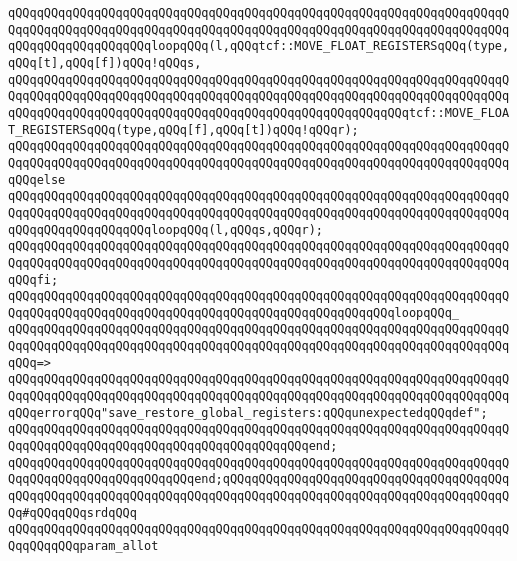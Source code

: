 \newline
\verb|qQQqqQQqqQQqqQQqqQQqqQQqqQQqqQQqqQQqqQQqqQQqqQQqqQQqqQQqqQQqqQQqqQQqqQQqqQQqqQQqqQQqqQQqqQQqqQQqqQQqqQQqqQQqqQQqqQQqqQQqqQQqqQQqqQQqqQQqqQQqqQQqqQQqqQQqqQQqqQQqloopqQQq(l,qQQqtcf::MOVE_FLOAT_REGISTERSqQQq(type,qQQq[t],qQQq[f])qQQq!qQQqs,|\newline
\verb|qQQqqQQqqQQqqQQqqQQqqQQqqQQqqQQqqQQqqQQqqQQqqQQqqQQqqQQqqQQqqQQqqQQqqQQqqQQqqQQqqQQqqQQqqQQqqQQqqQQqqQQqqQQqqQQqqQQqqQQqqQQqqQQqqQQqqQQqqQQqqQQqqQQqqQQqqQQqqQQqqQQqqQQqqQQqqQQqqQQqqQQqqQQqqQQqqQQqtcf::MOVE_FLOAT_REGISTERSqQQq(type,qQQq[f],qQQq[t])qQQq!qQQqr);|\newline
\verb|qQQqqQQqqQQqqQQqqQQqqQQqqQQqqQQqqQQqqQQqqQQqqQQqqQQqqQQqqQQqqQQqqQQqqQQqqQQqqQQqqQQqqQQqqQQqqQQqqQQqqQQqqQQqqQQqqQQqqQQqqQQqqQQqqQQqqQQqqQQqqQQqelse|\newline
\verb|qQQqqQQqqQQqqQQqqQQqqQQqqQQqqQQqqQQqqQQqqQQqqQQqqQQqqQQqqQQqqQQqqQQqqQQqqQQqqQQqqQQqqQQqqQQqqQQqqQQqqQQqqQQqqQQqqQQqqQQqqQQqqQQqqQQqqQQqqQQqqQQqqQQqqQQqqQQqqQQqloopqQQq(l,qQQqs,qQQqr);|\newline
\verb|qQQqqQQqqQQqqQQqqQQqqQQqqQQqqQQqqQQqqQQqqQQqqQQqqQQqqQQqqQQqqQQqqQQqqQQqqQQqqQQqqQQqqQQqqQQqqQQqqQQqqQQqqQQqqQQqqQQqqQQqqQQqqQQqqQQqqQQqqQQqqQQqfi;|\newline
\newline
\verb|qQQqqQQqqQQqqQQqqQQqqQQqqQQqqQQqqQQqqQQqqQQqqQQqqQQqqQQqqQQqqQQqqQQqqQQqqQQqqQQqqQQqqQQqqQQqqQQqqQQqqQQqqQQqqQQqqQQqqQQqqQQqloopqQQq_|\newline
\verb|qQQqqQQqqQQqqQQqqQQqqQQqqQQqqQQqqQQqqQQqqQQqqQQqqQQqqQQqqQQqqQQqqQQqqQQqqQQqqQQqqQQqqQQqqQQqqQQqqQQqqQQqqQQqqQQqqQQqqQQqqQQqqQQqqQQqqQQqqQQqqQQq=>|\newline
\verb|qQQqqQQqqQQqqQQqqQQqqQQqqQQqqQQqqQQqqQQqqQQqqQQqqQQqqQQqqQQqqQQqqQQqqQQqqQQqqQQqqQQqqQQqqQQqqQQqqQQqqQQqqQQqqQQqqQQqqQQqqQQqqQQqqQQqqQQqqQQqqQQqerrorqQQq"save_restore_global_registers:qQQqunexpectedqQQqdef";|\newline
\verb|qQQqqQQqqQQqqQQqqQQqqQQqqQQqqQQqqQQqqQQqqQQqqQQqqQQqqQQqqQQqqQQqqQQqqQQqqQQqqQQqqQQqqQQqqQQqqQQqqQQqqQQqqQQqqQQqend;|\newline
\verb|qQQqqQQqqQQqqQQqqQQqqQQqqQQqqQQqqQQqqQQqqQQqqQQqqQQqqQQqqQQqqQQqqQQqqQQqqQQqqQQqqQQqqQQqqQQqqQQqend;qQQqqQQqqQQqqQQqqQQqqQQqqQQqqQQqqQQqqQQqqQQqqQQqqQQqqQQqqQQqqQQqqQQqqQQqqQQqqQQqqQQqqQQqqQQqqQQqqQQqqQQqqQQqqQQq#qQQqqQQqsrdqQQq|\newline
\newline
\verb|qQQqqQQqqQQqqQQqqQQqqQQqqQQqqQQqqQQqqQQqqQQqqQQqqQQqqQQqqQQqqQQqqQQqqQQqqQQqqQQqparam_allot|\newline
